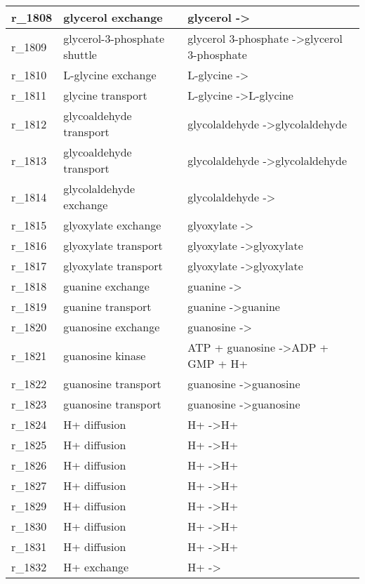 \begin{landscape}
{\begin{longtable}{|l|p{7cm}|p{15cm}|}
r\_1808 & glycerol exchange & glycerol  -\textgreater{} \\ \hline
r\_1809 & glycerol-3-phosphate shuttle & glycerol 3-phosphate  -\textgreater glycerol 3-phosphate \\ \hline
r\_1810 & L-glycine exchange & L-glycine  -\textgreater{} \\ \hline
r\_1811 & glycine transport & L-glycine  -\textgreater L-glycine \\ \hline
r\_1812 & glycoaldehyde transport & glycolaldehyde  -\textgreater glycolaldehyde \\ \hline
r\_1813 & glycoaldehyde transport & glycolaldehyde  -\textgreater glycolaldehyde \\ \hline
r\_1814 & glycolaldehyde exchange & glycolaldehyde  -\textgreater{} \\ \hline
r\_1815 & glyoxylate exchange & glyoxylate  -\textgreater{} \\ \hline
r\_1816 & glyoxylate transport & glyoxylate  -\textgreater glyoxylate \\ \hline
r\_1817 & glyoxylate transport & glyoxylate  -\textgreater glyoxylate \\ \hline
r\_1818 & guanine exchange & guanine  -\textgreater{} \\ \hline
r\_1819 & guanine transport & guanine  -\textgreater guanine \\ \hline
r\_1820 & guanosine exchange & guanosine  -\textgreater{} \\ \hline
r\_1821 & guanosine kinase & ATP + guanosine  -\textgreater ADP + GMP + H+ \\ \hline
r\_1822 & guanosine transport & guanosine  -\textgreater guanosine \\ \hline
r\_1823 & guanosine transport & guanosine  -\textgreater guanosine \\ \hline
r\_1824 & H+ diffusion & H+  -\textgreater H+ \\ \hline
r\_1825 & H+ diffusion & H+  -\textgreater H+ \\ \hline
r\_1826 & H+ diffusion & H+  -\textgreater H+ \\ \hline
r\_1827 & H+ diffusion & H+  -\textgreater H+ \\ \hline
r\_1829 & H+ diffusion & H+  -\textgreater H+ \\ \hline
r\_1830 & H+ diffusion & H+  -\textgreater H+ \\ \hline
r\_1831 & H+ diffusion & H+  -\textgreater H+ \\ \hline
r\_1832 & H+ exchange & H+  -\textgreater{} \\ \hline

\end{longtable}}
\end{landscape}
